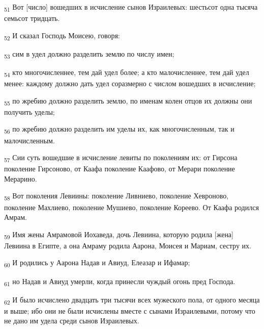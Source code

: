 \begin{tcolorbox}
\textsubscript{51} Вот [число] вошедших в исчисление сынов Израилевых: шестьсот одна тысяча семьсот тридцать.
\end{tcolorbox}
\begin{tcolorbox}
\textsubscript{52} И сказал Господь Моисею, говоря:
\end{tcolorbox}
\begin{tcolorbox}
\textsubscript{53} сим в удел должно разделить землю по числу имен;
\end{tcolorbox}
\begin{tcolorbox}
\textsubscript{54} кто многочисленнее, тем дай удел более; а кто малочисленнее, тем дай удел менее: каждому должно дать удел соразмерно с числом вошедших в исчисление;
\end{tcolorbox}
\begin{tcolorbox}
\textsubscript{55} по жребию должно разделить землю, по именам колен отцов их должны они получить уделы;
\end{tcolorbox}
\begin{tcolorbox}
\textsubscript{56} по жребию должно разделить им уделы их, как многочисленным, так и малочисленным.
\end{tcolorbox}
\begin{tcolorbox}
\textsubscript{57} Сии суть вошедшие в исчисление левиты по поколениям их: от Гирсона поколение Гирсоново, от Каафа поколение Каафово, от Мерари поколение Мерарино.
\end{tcolorbox}
\begin{tcolorbox}
\textsubscript{58} Вот поколения Левиины: поколение Ливниево, поколение Хевроново, поколение Махлиево, поколение Мушиево, поколение Кореево. От Каафа родился Амрам.
\end{tcolorbox}
\begin{tcolorbox}
\textsubscript{59} Имя жены Амрамовой Иохаведа, дочь Левиина, которую родила [жена] Левиина в Египте, а она Амраму родила Аарона, Моисея и Мариам, сестру их.
\end{tcolorbox}
\begin{tcolorbox}
\textsubscript{60} И родились у Аарона Надав и Авиуд, Елеазар и Ифамар;
\end{tcolorbox}
\begin{tcolorbox}
\textsubscript{61} но Надав и Авиуд умерли, когда принесли чуждый огонь пред Господа.
\end{tcolorbox}
\begin{tcolorbox}
\textsubscript{62} И было исчислено двадцать три тысячи всех мужеского пола, от одного месяца и выше; ибо они не были исчислены вместе с сынами Израилевыми, потому что не дано им удела среди сынов Израилевых.
\end{tcolorbox}
